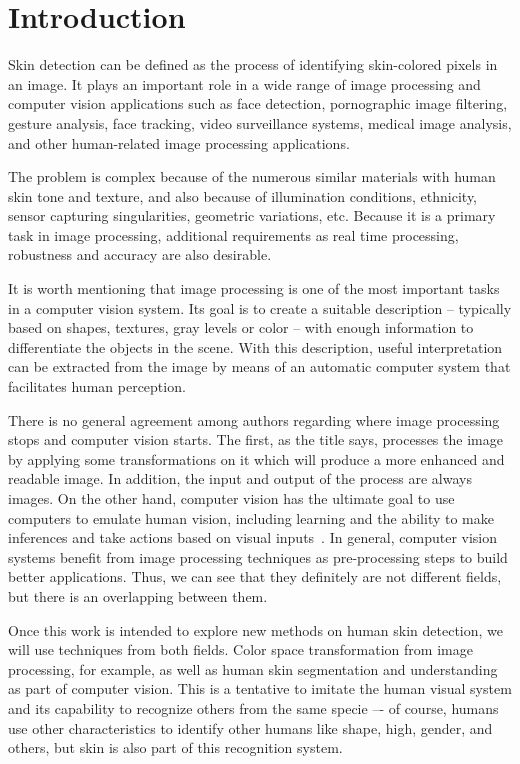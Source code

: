 \chapter{Introduction}
\label{cap:introducao}
Skin detection can be defined as the process of identifying skin-colored pixels in an image. It plays an important role in a wide range of image processing and computer vision applications such as face detection, pornographic image filtering, gesture analysis, face tracking, video surveillance systems, medical image analysis, and other human-related image processing applications.

The problem is complex because of the numerous similar materials with human skin tone and texture, and also because of illumination conditions, ethnicity, sensor capturing singularities, geometric variations, etc. Because it is a primary task in image processing, additional requirements as real time processing, robustness and accuracy are also desirable.

It is worth mentioning that image processing is one of the most important tasks in a computer vision system. Its goal is to create a suitable description -- typically based on shapes, textures, gray levels or color -- with enough information to differentiate the objects in the scene. With this description, useful interpretation can be extracted from the image by means of an automatic computer system that facilitates human perception.

There is no general agreement among authors regarding where image processing stops and computer vision starts. The first, as the title says, processes the image by applying some transformations on it which will produce a more enhanced and readable image. In addition, the input and output of the process are always images. On the other hand, computer vision has the ultimate goal to use computers to emulate human vision, including learning and the ability to make inferences and take actions based on visual inputs~\citep{gonzalez:02}. In general,
computer vision systems benefit from image processing techniques as pre-processing steps to build better applications. Thus, we can see that they definitely are not different fields, but there is an overlapping between them.

Once this work is intended to explore new methods on human skin detection, we will use techniques from both fields. Color space transformation from image processing, for example, as well as human skin segmentation and understanding as part of computer vision. This is a tentative to imitate the human visual system and its capability to recognize others from the same specie –- of course, humans use other characteristics to identify other humans like shape, high, gender, and others, but skin is also part of this recognition system.

